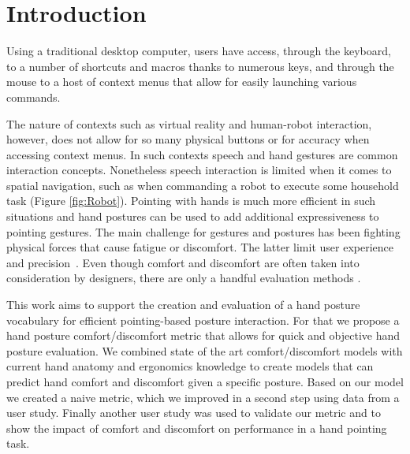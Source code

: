 \documentclass[headsepline,footsepline,footinclude=false,oneside,fontsize=11pt,paper=a4,listof=totoc,bibliography=totoc]{scrbook} %
\begin{document}


\frontmatter{}





\tableofcontents{}

\mainmatter{}



\section{Introduction}
Using a traditional desktop computer, users have access, through the keyboard, to a number of shortcuts and macros thanks to numerous keys, and through the mouse to a host of context menus that allow for easily launching various commands. 

The nature of contexts such as virtual reality and human-robot interaction, however, does not allow for so many physical buttons or for accuracy when accessing context menus. In such contexts speech and hand gestures are common interaction concepts. Nonetheless speech interaction is limited when it comes to spatial navigation, such as when commanding a robot to execute some household task (Figure \ref{fig:Robot}). Pointing with hands is much more efficient in such situations and hand postures can be used to add additional expressiveness to pointing gestures. The main challenge for gestures and postures has been fighting physical forces that cause fatigue or discomfort. The latter limit user experience and precision~\cite{short1999precision}. Even though comfort and discomfort are often taken into consideration by designers, there are only a handful evaluation methods \cite{naddeo2015proposal}.

This work aims to support the creation and evaluation of a hand posture vocabulary for efficient pointing-based posture interaction. For that we propose a hand posture comfort/discomfort metric that allows for quick and objective hand posture evaluation. We combined state of the art comfort/discomfort models with current hand anatomy and ergonomics knowledge to create models that can predict hand comfort and discomfort given a specific posture. Based on our model we created a naive metric, which we improved in a second step using data from a user study. Finally another user study was used to validate our metric and to show the impact of comfort and discomfort on performance in a hand pointing task.
\end{document}
